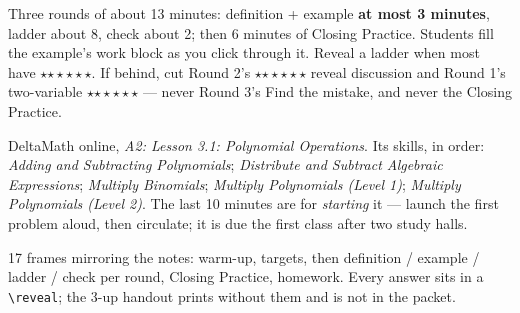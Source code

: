 \documentclass[10pt]{article}
\newcommand{\rung}[1]{{\color{goldacc}\ifcase#1\or$\star$\or$\star\star$\or$\star\star\star$\fi}}
\begin{document}
\begin{teachernote}
Three rounds of about 13 minutes: definition + example \textbf{at most 3 minutes}, ladder about
8, check about 2; then 6 minutes of Closing Practice. Students fill the example's work block as
you click through it. Reveal a ladder when most have \rung2. If behind, cut Round 2's \rung3
reveal discussion and Round 1's two-variable \rung3 --- never Round 3's Find the mistake, and
never the Closing Practice.
\end{teachernote}

\begin{teachernote}[Homework]
DeltaMath online, \emph{A2: Lesson 3.1: Polynomial Operations}. Its skills, in order: \emph{Adding and Subtracting Polynomials}; \emph{Distribute and Subtract Algebraic Expressions}; \emph{Multiply Binomials}; \emph{Multiply Polynomials (Level 1)}; \emph{Multiply Polynomials (Level 2)}. The last 10 minutes are for \emph{starting} it --- launch the first problem aloud,
then circulate; it is due the first class after two study halls.
\end{teachernote}

\begin{teachernote}[Slides]
17 frames mirroring the notes: warm-up, targets, then definition / example / ladder / check per
round, Closing Practice, homework. Every answer sits in a \texttt{\textbackslash reveal}; the 3-up
handout prints without them and is not in the packet.
\end{teachernote}
\end{document}
